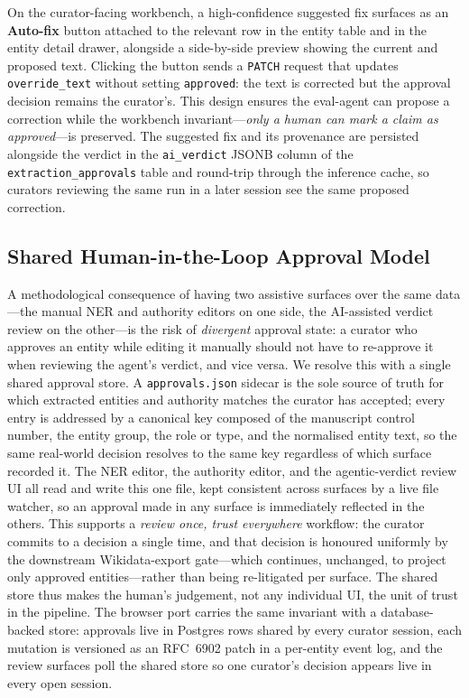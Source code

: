 \documentclass[Afour,sageh,times]{sagej}
\begin{document}
On the curator-facing workbench, a high-confidence suggested fix surfaces as an \textbf{Auto-fix} button attached to the relevant row in the entity table and in the entity detail drawer, alongside a side-by-side preview showing the current and proposed text. Clicking the button sends a \texttt{PATCH} request that updates \texttt{override\_text} without setting \texttt{approved}: the text is corrected but the approval decision remains the curator's. This design ensures the eval-agent can propose a correction while the workbench invariant---\emph{only a human can mark a claim as approved}---is preserved. The suggested fix and its provenance are persisted alongside the verdict in the \texttt{ai\_verdict} JSONB column of the \texttt{extraction\_approvals} table and round-trip through the inference cache, so curators reviewing the same run in a later session see the same proposed correction.

\subsection{Shared Human-in-the-Loop Approval Model}
\label{sec:shared-approval}

A methodological consequence of having two assistive surfaces over the same data---the manual NER and authority editors on one side, the AI-assisted verdict review on the other---is the risk of \emph{divergent} approval state: a curator who approves an entity while editing it manually should not have to re-approve it when reviewing the agent's verdict, and vice versa. We resolve this with a single shared approval store. A \texttt{approvals.json} sidecar is the sole source of truth for which extracted entities and authority matches the curator has accepted; every entry is addressed by a canonical key composed of the manuscript control number, the entity group, the role or type, and the normalised entity text, so the same real-world decision resolves to the same key regardless of which surface recorded it. The NER editor, the authority editor, and the agentic-verdict review UI all read and write this one file, kept consistent across surfaces by a live file watcher, so an approval made in any surface is immediately reflected in the others. This supports a \emph{review once, trust everywhere} workflow: the curator commits to a decision a single time, and that decision is honoured uniformly by the downstream Wikidata-export gate---which continues, unchanged, to project only approved entities---rather than being re-litigated per surface. The shared store thus makes the human's judgement, not any individual UI, the unit of trust in the pipeline. The browser port carries the same invariant with a database-backed store: approvals live in Postgres rows shared by every curator session, each mutation is versioned as an RFC~6902 patch in a per-entity event log, and the review surfaces poll the shared store so one curator's decision appears live in every open session.
\end{document}
